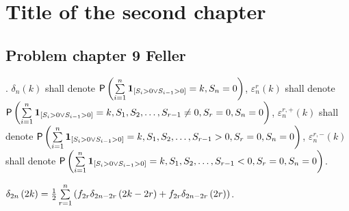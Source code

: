 \chapter{Title of the second chapter}

\section{Problem chapter 9 Feller}
\begin{defn}[$\delta, \varepsilon$]
  \Lrws. $\delta_{n}\left( k\right)$ shall denote $\pr\left(\suma \indikator{S_i>0 \lor S_{i-1}>0}=k, S_n=0 \right)$, $\varepsilon_{n}^r\left(k \right)$ shall denote $\pr\left(\suma \indikator{S_i>0 \lor S_{i-1}>0}=k, S_1, S_2, \ldots, S_{r-1}\neq 0, S_r=0, S_n=0 \right)$,
  $\varepsilon_{n}^{r,+}\left(k \right)$ shall denote $\pr\left(\suma \indikator{S_i>0 \lor S_{i-1}>0}=k, S_1, S_2, \ldots, S_{r-1} > 0, S_r=0, S_n=0 \right)$,
  $\varepsilon_{n}^{r,-}\left(k \right)$ shall denote $\pr\left(\suma \indikator{S_i>0 \lor S_{i-1}>0}=k, S_1, S_2, \ldots, S_{r-1} < 0, S_r=0, S_n=0 \right)$.
\end{defn}
\begin{lemma}\label{thm-factorization_lemma}
  $\delta_{2n}\left( 2k\right)=\h \suma[r][1][n]\left( f_{2r} \delta_{2n-2r}\left(2k-2r\right)+f_{2r} \delta_{2n-2r}\left( 2r \right)\right)$.
\end{lemma}
